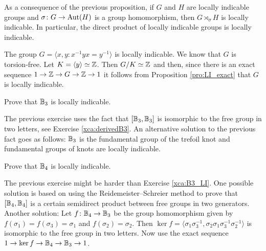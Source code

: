 As a consequence of the previous proposition, 
if $G$ and $H$ are locally indicable groups and 
$\sigma\colon G\to\operatorname{Aut}(H)$ is a group homomorphism, then 
$G\rtimes_\sigma H$ is locally indicable. In particular, the 
direct product of locally indicable groups is locally indicable.

\begin{example}
    The group $G=\langle x,y:x^{-1}yx=y^{-1}\rangle$ is
    locally indicable. We know that $G$ is torsion-free. Let 
    $K=\langle y\rangle\simeq\mathbb{Z}$. Then $G/K\simeq\mathbb{Z}$ and 
    then, since there is an exact sequence
    $1\to\mathbb{Z}\to G\to\mathbb{Z}\to1$ 
    it follows from Proposition \ref{pro:LI_exact} 
    that $G$ is locally indicable.
\end{example}


\begin{exercise}
\label{xca:B3_LI}
    Prove that $\mathbb{B}_3$ is locally indicable. 
\end{exercise}

The previous exercise uses the fact that $[\mathbb{B}_3,\mathbb{B}_3]$ is isomorphic to the free group in two letters, see
Exercise \ref{xca:derivedB3}.
An alternative solution to the previous fact goes as follows: $\mathbb{B}_3$ is the fundamental group
of the trefoil knot and fundamental groups of knots are locally indicable. 

\begin{exercise}
    Prove that $\mathbb{B}_4$ is locally indicable.
\end{exercise}

The previous exercise might be harder than Exercise \ref{xca:B3_LI}. One possible solution
is based on using the Reidemeister--Schreier method to prove that 
$[\mathbb{B}_4,\mathbb{B}_4]$ is a certain semidirect product 
between free groups in two generators. Another solution: Let 
$f\colon\mathbb{B}_4\to\mathbb{B}_3$ be the group homomorphism given by $f(\sigma_1)=f(\sigma_3)=\sigma_1$ 
and $f(\sigma_2)=\sigma_2$. Then $\ker f=\langle \sigma_1\sigma_3^{-1},\sigma_2\sigma_1\sigma_3^{-1}\sigma_2^{-1}\rangle$ 
is isomorphic to the free group in two letters. Now use the exact sequence
$1\to \ker f\to\mathbb{B}_4\to\mathbb{B}_3\to1$. 

